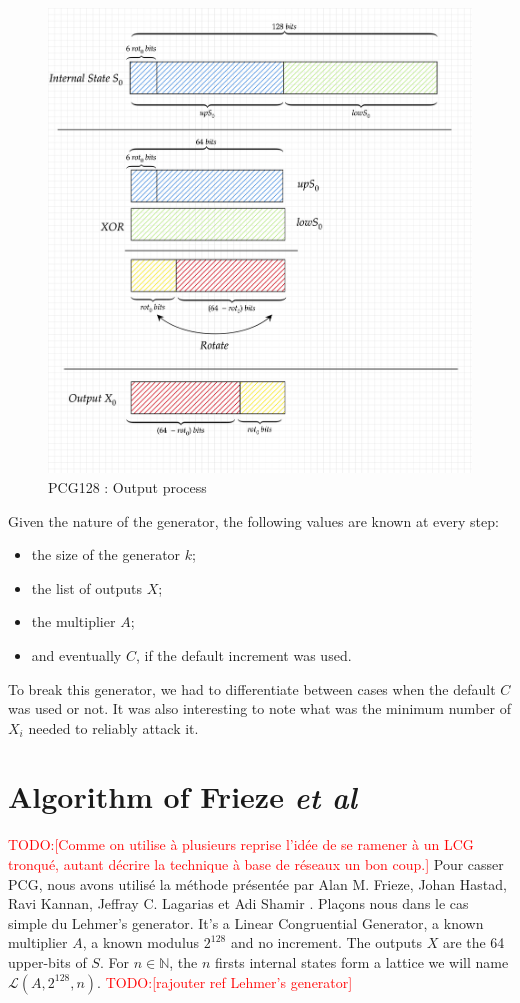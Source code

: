 \documentclass[preprint]{iacrtrans}
\newcommand{\todo}[1]{\textcolor{red}{TODO:[#1]}}
\begin{document}
\begin{figure}[h!]
    \centering
    \includegraphics[width=0.75\linewidth]{pictures/PCG128.png}
    \caption{PCG128 : Output process}
    \label{pcg128out}
\end{figure}



Given the nature of the generator, the following values are known at every step:
\begin{itemize}
    \item the size of the generator $k$;
    \item the list of outputs $X$;
    \item the multiplier $A$;
    \item and eventually $C$, if the default increment was used. 
\end{itemize}

To break this generator, we had to differentiate between cases when the default $C$ was used or not. It was also interesting to note what was the minimum number of $X_i$ needed to reliably attack it.





\section{Algorithm of Frieze \textit{et al}}

\todo{Comme on utilise à plusieurs reprise l'idée de se ramener à un LCG
  tronqué, autant décrire la technique à base de réseaux un bon coup.}
Pour casser PCG, nous avons utilisé la méthode présentée par Alan M. Frieze, Johan Hastad, Ravi Kannan, Jeffray C. Lagarias et Adi Shamir \cite{Frieze}. Plaçons nous dans le cas simple du Lehmer's generator\cite{Lehmer}. It's a Linear Congruential Generator, a known multiplier $A$, a known modulus $2^128$ and no increment. The outputs $X$ are the 64 upper-bits of $S$. For $n \in \mathbb{N}$, the $n$ firsts internal states form a lattice we will name $\mathcal{L}(A,2^{128},n)$. 
\todo{rajouter ref Lehmer's generator}
\end{document}
